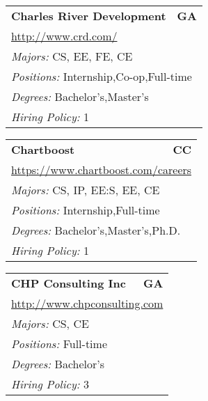 \documentclass[twoside]{article}
\begin{document}
\begin{center}
\begin{multicols}{3}
\begin{FlushLeft}
\begin{minipage}{.9\columnwidth}
\end{minipage}
 
\begin{minipage}{.9\columnwidth}\begin{tabularx}{.95\columnwidth}{Xr}
                 {\Large\bf Charles River Development} & {\Large\bf GA}\\
    \multicolumn{2}{p{.95\columnwidth}}{\url{http://www.crd.com/}}\\
    \multicolumn{2}{p{.95\columnwidth}}{\emph{Majors:} CS, EE, FE, CE}\\
    \multicolumn{2}{p{.95\columnwidth}}{\emph{Positions:} Internship,Co-op,Full-time}\\
    \multicolumn{2}{p{.95\columnwidth}}{\emph{Degrees:} Bachelor's,Master's}\\
    \multicolumn{2}{p{.95\columnwidth}}{\emph{Hiring Policy:} 1}\\
    \end{tabularx}
    
\end{minipage}
 
\begin{minipage}{.9\columnwidth}\begin{tabularx}{.95\columnwidth}{Xr}
                 {\Large\bf Chartboost} & {\Large\bf CC}\\
    \multicolumn{2}{p{.95\columnwidth}}{\url{https://www.chartboost.com/careers}}\\
    \multicolumn{2}{p{.95\columnwidth}}{\emph{Majors:} CS, IP, EE:S, EE, CE}\\
    \multicolumn{2}{p{.95\columnwidth}}{\emph{Positions:} Internship,Full-time}\\
    \multicolumn{2}{p{.95\columnwidth}}{\emph{Degrees:} Bachelor's,Master's,Ph.D.}\\
    \multicolumn{2}{p{.95\columnwidth}}{\emph{Hiring Policy:} 1}\\
    \end{tabularx}
    
\end{minipage}
 
\begin{minipage}{.9\columnwidth}\begin{tabularx}{.95\columnwidth}{Xr}
                 {\Large\bf CHP Consulting Inc} & {\Large\bf GA}\\
    \multicolumn{2}{p{.95\columnwidth}}{\url{http://www.chpconsulting.com}}\\
    \multicolumn{2}{p{.95\columnwidth}}{\emph{Majors:} CS, CE}\\
    \multicolumn{2}{p{.95\columnwidth}}{\emph{Positions:} Full-time}\\
    \multicolumn{2}{p{.95\columnwidth}}{\emph{Degrees:} Bachelor's}\\
    \multicolumn{2}{p{.95\columnwidth}}{\emph{Hiring Policy:} 3}\\
    \end{tabularx}
    

\end{minipage}
\end{FlushLeft}
\end{multicols}
\end{center}
\end{document}
